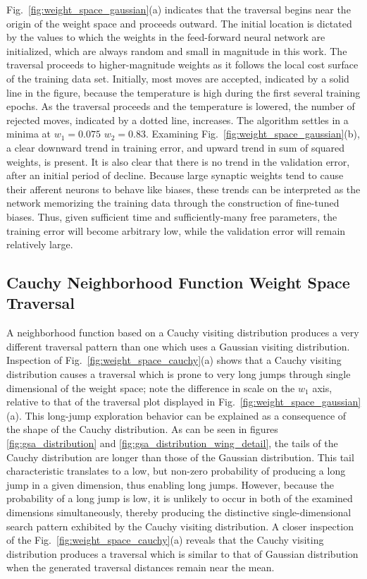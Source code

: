\documentclass[11pt]{afthesis}
\begin{document}
	
	 	
	Fig.~\ref{fig:weight_space_gaussian}(a) indicates that the traversal begins near the origin of the weight space and proceeds outward. The initial location is dictated by the values to which the weights in the feed-forward neural network are initialized, which are always random and small in magnitude in this work. The traversal proceeds to higher-magnitude weights as it follows the local cost surface of the training data set. Initially, most moves are accepted, indicated by a solid line in the figure, because the temperature is high during the first several training epochs. As the traversal proceeds and the temperature is lowered, the number of rejected moves, indicated by a dotted line, increases. The algorithm settles in a minima at $w_1=0.075$ $w_2=0.83$. Examining Fig.~\ref{fig:weight_space_gaussian}(b), a clear downward trend in training error, and upward trend in sum of squared weights, is present. It is also clear that there is no trend in the validation error, after an initial period of decline. Because large synaptic weights tend to cause their afferent neurons to behave like biases, these trends can be interpreted as the network memorizing the training data through the construction of fine-tuned biases. Thus, given sufficient time and sufficiently-many free parameters, the training error will become arbitrary low, while the validation error will remain relatively large.
	 
	 

	 
	\subsection{Cauchy Neighborhood Function Weight Space Traversal} 
	\label{sec:weight_traversal_cauchy}

	A neighborhood function based on a Cauchy visiting distribution produces a very different traversal pattern than one which uses a Gaussian visiting distribution. Inspection of Fig.~\ref{fig:weight_space_cauchy}(a) shows that a Cauchy visiting distribution causes a traversal which is prone to very long jumps through single dimensional of the weight space; note the difference in scale on the $w_1$ axis, relative to that of the traversal plot displayed in Fig.~\ref{fig:weight_space_gaussian}(a). This long-jump exploration behavior can be explained as a consequence of the shape of the Cauchy distribution. As can be seen in figures \ref{fig:gsa_distribution} and \ref{fig:gsa_distribution_wing_detail}, the tails of the Cauchy distribution are longer than those of the Gaussian distribution. This tail characteristic translates to a low, but non-zero probability of producing a long jump in a given dimension, thus enabling long jumps. However, because the probability of a long jump is low, it is unlikely to occur in both of the examined dimensions simultaneously, thereby producing the distinctive single-dimensional search pattern exhibited by the Cauchy visiting distribution. A closer inspection of the Fig.~\ref{fig:weight_space_cauchy}(a) reveals that the Cauchy visiting distribution produces a traversal which is similar to that of Gaussian distribution when the generated traversal distances remain near the mean.
	 
\end{document}
